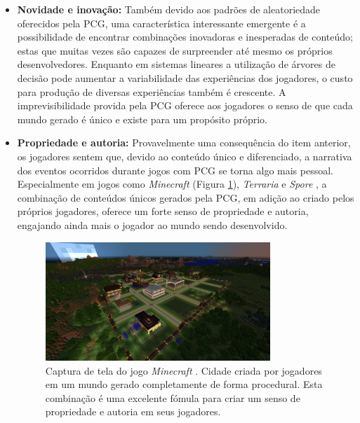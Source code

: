 \begin{itemize}[leftmargin=1.25\parindent]
    \item \textbf{Novidade e inovação:} Também devido aos padrões de aleatoriedade oferecidos pela PCG, uma característica interessante emergente é a possibilidade de encontrar combinações inovadoras e inesperadas de conteúdo; estas que muitas vezes são capazes de surpreender até mesmo os próprios desenvolvedores. Enquanto em sistemas lineares a utilização de árvores de decisão pode aumentar a variabilidade das experiências dos jogadores, o custo para produção de diversas experiências também é crescente. A imprevisibilidade provida pela PCG oferece aos jogadores o senso de que cada mundo gerado é único e existe para um propósito próprio.
    \item \textbf{Propriedade e autoria:} Provavelmente uma consequência do item anterior, os jogadores sentem que, devido ao conteúdo único e diferenciado, a narrativa dos eventos ocorridos durante jogos com PCG se torna algo mais pessoal. Especialmente em jogos como \emph{Minecraft} \cite{game:minecraft} (Figura \ref{fig:game_minecraft}), \emph{Terraria} \cite{game:terraria} e \emph{Spore} \cite{game:spore}, a combinação de conteúdos únicos gerados pela PCG, em adição ao criado pelos próprios jogadores, oferece um forte senso de propriedade e autoria, engajando ainda mais o jogador ao mundo sendo desenvolvido.
    
    \begin{figure}[htb]
    	\begin{center}
    		\includegraphics[width=0.8\textwidth]{Imagens/game_minecraft.png}
    		\caption{Captura de tela do jogo \emph{Minecraft} \cite{game:minecraft}. Cidade criada por jogadores em um mundo gerado completamente de forma procedural. Esta combinação é uma excelente fómula para criar um senso de propriedade e autoria em seus jogadores.}
    		\label{fig:game_minecraft}
    	\end{center}
    \end{figure}
    
\end{itemize}

